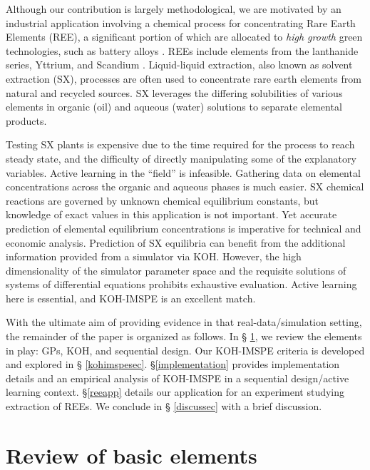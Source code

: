 \documentclass[
]{article}
\begin{document}
Although our contribution is largely methodological, we are motivated
by an industrial application involving a chemical process for concentrating Rare Earth
Elements (REE), a significant portion of which are allocated to \emph{high
growth} green technologies, such as battery alloys \citep{Goonan2011, balaram2019rare}. REEs include elements from the lanthanide series,
Yttrium, and Scandium \citep{VanGosen2014}. Liquid-liquid extraction, also
known as solvent extraction (SX), processes are often used to
concentrate rare earth elements \citep{gupta} from natural and recycled
sources. SX leverages the differing solubilities of various elements in
organic (oil) and aqueous (water) solutions to separate elemental products.

Testing SX plants is expensive due to the time required for the process to
reach steady state, and the difficulty of directly manipulating some of the
explanatory variables. Active learning in the ``field'' is infeasible. Gathering data on elemental concentrations
across the organic and aqueous phases is much easier. SX chemical reactions are governed by unknown chemical equilibrium constants, but knowledge of exact values in this application is not important. Yet accurate prediction of elemental equilibrium concentrations is imperative for technical and economic analysis. Prediction of SX
equilibria can benefit from the additional information provided from a
simulator via KOH. However, the high dimensionality of the simulator parameter
space and the requisite solutions of systems of differential equations
prohibits exhaustive evaluation. Active learning here is essential, and
KOH-IMSPE is an excellent match.

With the ultimate aim of providing evidence in that real-data/simulation
setting, the remainder of the paper is organized as follows. In \S
\ref{revsec}, we review the elements in play: GPs, KOH, and sequential
design. Our KOH-IMSPE criteria is developed and explored in \S
\ref{kohimspesec}. \S \ref{implementation} provides implementation
details and an empirical analysis of KOH-IMSPE in a sequential
design/active learning context. \S \ref{reeapp} details our application
for an experiment studying extraction of REEs. We conclude in \S
\ref{discussec} with a brief discussion.

\hypertarget{revsec}{%
\section{Review of basic elements}\label{revsec}}
\end{document}
